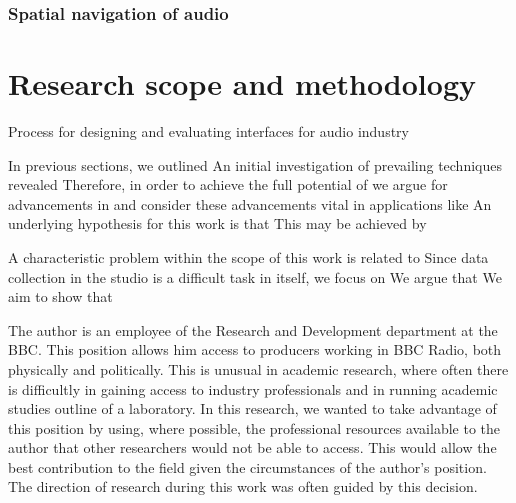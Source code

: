 \subsubsection{Spatial navigation of audio}
\citep{Kobayashi1997}



\section{Research scope and methodology}


Process for designing and evaluating interfaces for audio industry \citep{Dewey2014}

In previous sections, we outlined
An initial investigation of prevailing techniques revealed
Therefore, in order to achieve the full potential of 
we argue for advancements in 
and consider these advancements vital in applications like 
An underlying hypothesis for this work is that
This may be achieved by

A characteristic problem within the scope of this work is related to 
Since data collection in the studio is a difficult task in itself, we focus on
We argue that
We aim to show that

The author is an employee of the  Research and Development department at the BBC. This position allows him access to
producers working in BBC Radio, both physically and politically. This is unusual in academic research, where often
there is difficultly in gaining access to industry professionals and in running academic studies outline of a
laboratory. In this research, we wanted to take advantage of this position by using, where possible, the professional
resources available to the author that other researchers would not be able to access. This would allow the best
contribution to the field given the circumstances of the author's position. The direction of research during this work
was often guided by this decision.

